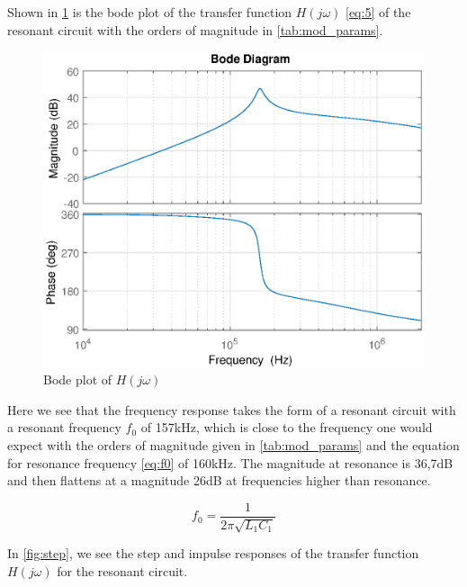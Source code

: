 Shown in \cref{fig:bode} is the bode plot of the transfer function $H(j\omega)$ \cref{eq:5} of the resonant circuit with the orders of magnitude in \cref{tab:mod_params}.

\begin{figure}[H]
    \centering
    \includegraphics[width=\textwidth]{img/CoilRigBode.eps}
    \caption{Bode plot of $H(j\omega)$}
    \label{fig:bode}
\end{figure}

Here we see that the frequency response takes the form of a resonant circuit with a resonant frequency $f_0$ of 157kHz, which is close to the frequency one would expect with the orders of magnitude given in \cref{tab:mod_params} and the equation for resonance frequency \cref{eq:f0} of 160kHz. The magnitude at resonance is 36,7dB and then flattens at a magnitude 26dB at frequencies higher than resonance.

\begin{equation} \label{eq:f0}
    f_0 = \frac{1}{2 \pi \sqrt{L_1 C_1}}
\end{equation}


In \cref{fig:step}, we see the step and impulse responses of the transfer function $H(j\omega)$ for the resonant circuit.

